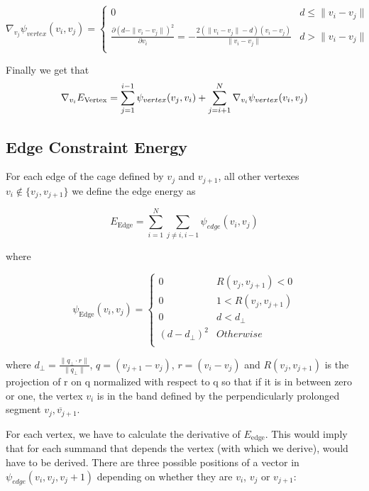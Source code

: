 \begin{equation}
\nabla_{v_j} \psi_{vertex}(v_i, v_j)= 
\begin{cases} 
0 & d\leq\|v_i - v_j\|  \\
\frac{\partial (d-\|v_i-v_j\|)^2}{\partial v_i} = -\frac{2(\|v_i - v_j\|-d)(v_i-v_j)}{\|v_i - v_j\|} & d>\|v_i - v_j\| \\
\end{cases}
\end{equation}

Finally we get that 
\begin{equation}
	\nabla_{v_i}E_{\mathrm{Vertex}} = \sum_{j=1}^{i-1}\limits\psi_{vertex}(v_j, v_i)+\sum\limits_{j=i+1}^{N}\nabla_{v_i} \psi_{vertex}(v_i, v_j)
\end{equation}


\subsection*{Edge Constraint Energy}
\label{subsubsec:edge_constraint_energy}
For each edge of the cage defined by $v_j$ and $v_{j+1}$, all other vertexes $v_i\notin \{v_j,v_{j+1}\}$ we define the edge energy as 

\begin{equation}
E_{\mathrm{Edge}} = \sum\limits_{i=1}^N\sum\limits_{j \neq i, i-1} \psi_{edge}(v_i,v_j)
\end{equation}

where 

\begin{equation}
\psi_{\mathrm{Edge}} (v_i,v_j) = 
\begin{cases} 
0 & R(v_j, v_{j+1})  < 0  \\
0 & 1<R(v_j, v_{j+1}) \\
0 & d<d_{\perp}\\
(d-d_{\perp})^2 & Otherwise \\
\end{cases}
\end{equation}

where $d_{\perp}=\frac{\|q_{\perp} \cdot r\|}{\|q_{\perp}\|}$, $q=(v_{j+1}-v_j)$, $r=(v_i-v_j)$ and $R(v_j, v_{j+1})$ is the projection of r on q normalized with respect to q so that if it is in between zero or one, the vertex $v_i$ is in the band defined by the perpendicularly prolonged segment $\overline{v_j,v_{j+1}}$.

For each vertex, we have to calculate the derivative of $E_{\mathrm{edge}}$. This would imply that for each summand that depends the vertex (with which we derive), would have to be derived. There are three possible positions of a vector in $\psi_{edge} (v_i,v_j,v_j+1)$ depending on whether they are $v_i$, $v_j$ or $v_{j+1}$:

